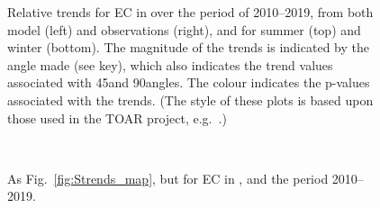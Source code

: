 \begin{figure}
\caption{Relative trends for EC in \pmfine over the period of 2010--2019, from both model (left) and observations (right), and for summer (top) and winter (bottom). The magnitude of the trends is indicated by the angle made (see key), which also indicates the trend values associated with 45\degrees and 90\degrees angles. The colour indicates the p-values associated with the trends. (The style of these plots is based upon those used in the TOAR project, e.g.~\citealt{ChangK-L:2017,MillsTOAR:2018}.)
  \label{fig:ECarrows}}
\end{figure}
\begin{figure}  %
  \\
\caption{As Fig.~\ref{fig:Strends_map}, but for EC in \pmfine, and the period 2010--2019.
\label{fig:ECtrends}}
\end{figure}


